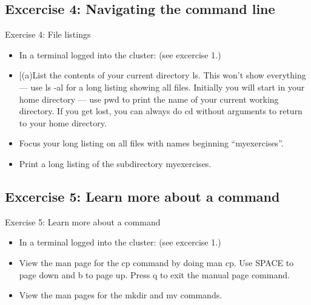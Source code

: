 \documentclass[handout]{beamer} %
\begin{document}
\subsection{Excercise 4: Navigating the command line}
\begin{frame}{Exercise 4: File listings}
\begin{itemize}
\item{In a terminal logged into the cluster: (see excercise 1.)}
\item{[(a)List the contents of your current directory \alert{ls}. This won't show everything --- use \alert{ls -al} for a long listing showing all files. Initially you will start in your home directory --- use \alert{pwd} to print the name of your current working directory. If you get lost, you can always do \alert{cd} without arguments to return to your home directory.}

\item[(b)]{Focus your long listing on \alert{all files with names beginning ``myexercises''}.}
\item[(c)]{Print a long listing of the subdirectory \alert{myexercises}.}
\end{itemize}
\end{frame}

\subsection{Excercise 5: Learn more about a command}
\begin{frame}{Exercise 5: Learn more about a command}
\begin{itemize}
\item{In a terminal logged into the cluster: (see excercise 1.)}
\item[(a)]{View the man page for the \alert{cp} command by doing \alert{man cp}. 
Use \alert{SPACE} to page down and \alert{b} to page up. Press \alert{q} to exit the manual page command.}
\item[(b)]{View the man pages for the \alert{mkdir} and \alert{mv} commands. }
\end{itemize}
\end{frame}
\end{document}
